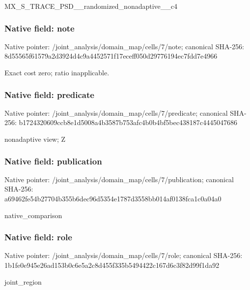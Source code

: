 \documentclass[10pt,a4paper]{article}
\begin{document}
\begingroup\raggedright\sloppy MX\_\allowbreak{}S\_\allowbreak{}TRACE\_\allowbreak{}PSD\_\allowbreak{}\_\allowbreak{}randomized\_\allowbreak{}nonadaptive\_\allowbreak{}\_\allowbreak{}c4\par\endgroup

\subsubsection{Native field: note}
Native pointer: /joint\_\allowbreak{}analysis/domain\_\allowbreak{}map/cells/7/note; canonical SHA-256: 8d55565f61579a2d3924d4c9a4452571f17eceff050d29776194ec7fdd7e4966

\begingroup\raggedright\sloppy Exact cost zero;\allowbreak{} ratio inapplicable.\par\endgroup

\subsubsection{Native field: predicate}
Native pointer: /joint\_\allowbreak{}analysis/domain\_\allowbreak{}map/cells/7/predicate; canonical SHA-256: b1724320609ccb8e1d5008a4b3587b753afc4b0b4bf5bec438187c4445047686

\begingroup\raggedright\sloppy nonadaptive view;\allowbreak{} Z\par\endgroup

\subsubsection{Native field: publication}
Native pointer: /joint\_\allowbreak{}analysis/domain\_\allowbreak{}map/cells/7/publication; canonical SHA-256: a69462fe54b27704b355b6dec96d5354e1787d3558bb014af0138fca1c0a04a0

\begingroup\raggedright\sloppy native\_\allowbreak{}comparison\par\endgroup

\subsubsection{Native field: role}
Native pointer: /joint\_\allowbreak{}analysis/domain\_\allowbreak{}map/cells/7/role; canonical SHA-256: 1b1fe0e945e26ad153b0c6e5a2c8d455f335b5494422c167d6c3f82d99f1da92

\begingroup\raggedright\sloppy joint\_\allowbreak{}region\par\endgroup
\end{document}
